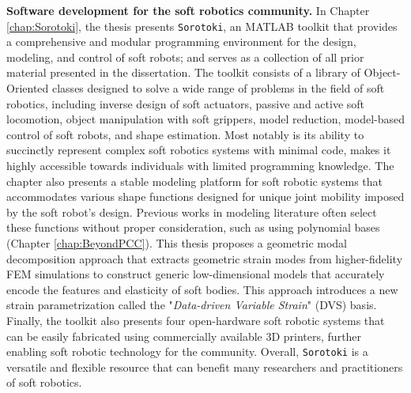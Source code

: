 \textbf{Software development for the soft robotics community.} In Chapter \ref{chap:Sorotoki}, the thesis presents \texttt{Sorotoki}, an MATLAB toolkit that provides a comprehensive and modular programming environment for the design, modeling, and control of soft robots; and  serves as a collection of all prior material presented in the dissertation. The toolkit consists of a library of Object-Oriented classes designed to solve a wide range of problems in the field of soft robotics, including inverse design of soft actuators, passive and active soft locomotion, object manipulation with soft grippers, model reduction, model-based control of soft robots, and shape estimation. Most notably is its ability to succinctly represent complex soft robotics systems with minimal code, makes it highly accessible towards individuals with limited programming knowledge. The chapter also presents a stable modeling platform for soft robotic systems that accommodates various shape functions designed for unique joint mobility imposed by the soft robot's design. Previous works in modeling literature often select these functions without proper consideration, such as using polynomial bases (Chapter \ref{chap:BeyondPCC}). This thesis proposes a geometric modal decomposition approach that extracts geometric strain modes from higher-fidelity FEM simulations to construct generic low-dimensional models that accurately encode the features and elasticity of soft bodies. This approach introduces a new strain parametrization called the "\textit{Data-driven Variable Strain}" (DVS) basis. Finally, the toolkit also presents four open-hardware soft robotic systems that can be easily fabricated using commercially available 3D printers, further enabling soft robotic technology for the community. Overall, \texttt{Sorotoki} is a versatile and flexible resource that can benefit many researchers and practitioners of soft robotics.

